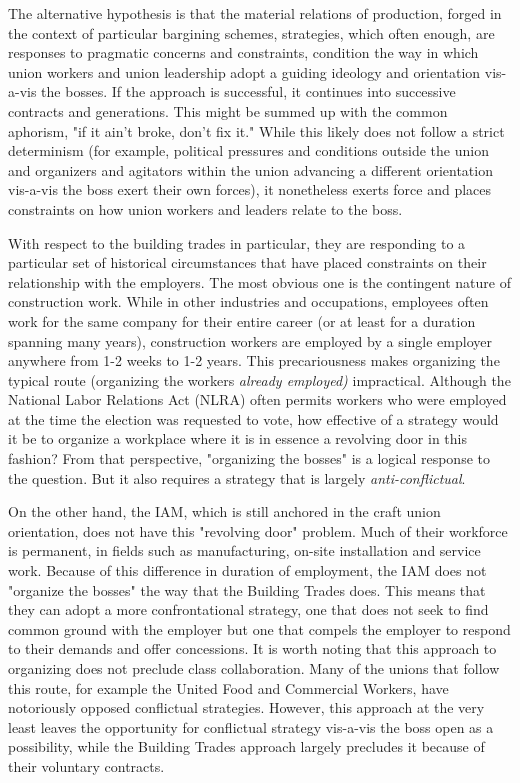 The alternative hypothesis is that the material relations of production, forged in the context of particular bargining schemes, strategies, which often enough, are responses to pragmatic concerns and constraints, condition the way in which union workers and union leadership adopt a guiding ideology and orientation vis-a-vis the bosses. If the approach is successful, it continues into successive contracts and generations. This might be summed up with the common aphorism, "if it ain’t broke, don’t fix it." While this likely does not follow a strict determinism (for example, political pressures and conditions outside the union and organizers and agitators within the union advancing a different orientation vis-a-vis the boss exert their own forces), it nonetheless exerts force and places constraints on how union workers and leaders relate to the boss.

With respect to the building trades in particular, they are responding to a particular set of historical circumstances that have placed constraints on their relationship with the employers. The most obvious one is the contingent nature of construction work. While in other industries and occupations, employees often work for the same company for their entire career (or at least for a duration spanning many years), construction workers are employed by a single employer anywhere from 1-2 weeks to 1-2 years.  This precariousness makes organizing the typical route (organizing the workers \textit{already employed)} impractical. Although the National Labor Relations Act (NLRA) often permits workers who were employed at the time the election was requested to vote, how effective of a strategy would it be to organize a workplace where it is in essence a revolving door in this fashion? From that perspective, "organizing the bosses" is a logical response to the question. But it also requires a strategy that is largely \textit{anti-conflictual}.

On the other hand, the IAM, which is still anchored in the craft union orientation, does not have this "revolving door" problem. Much of their workforce is permanent, in fields such as manufacturing, on-site installation and service work.  Because of this difference in duration of employment, the IAM does not "organize the bosses" the way that the Building Trades does. This means that they can adopt a more confrontational strategy, one that does not seek to find common ground with the employer but one that compels the employer to respond to their demands and offer concessions. It is worth noting that this approach to organizing does not preclude class collaboration. Many of the unions that follow this route, for example the United Food and Commercial Workers, have notoriously opposed conflictual strategies. However, this approach at the very least leaves the opportunity for conflictual strategy vis-a-vis the boss open as a possibility, while the Building Trades approach largely precludes it because of their voluntary contracts. 

